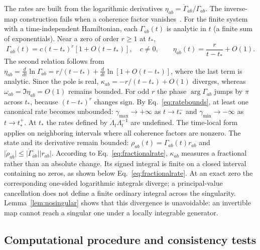 \documentclass[11pt,a4paper]{article}
\begin{document}
The rates are built from the logarithmic derivatives
$\eta_{ab}=\dot\Gamma_{ab}/\Gamma_{ab}$. The inverse-map construction
fails when a coherence factor vanishes~\cite{Hall2014}. For the finite
system with a time-independent Hamiltonian, each $\Gamma_{ab}(t)$ is
analytic in $t$ (a finite sum of exponentials). Near a zero of order
$r\ge1$ at $t_*$,
\begin{equation}
 \Gamma_{ab}(t)=c(t-t_*)^r[1+O(t-t_*)],\quad c\ne0,
 \qquad \eta_{ab}(t)=\frac{r}{t-t_*}+O(1).
 \label{eq:singularfactor}
\end{equation}
The second relation follows from
$\eta_{ab}=\frac{d}{dt}\ln\Gamma_{ab}=r/(t-t_*)+\frac{d}{dt}\ln[1+O(t-t_*)]$,
where the last term is analytic. Since the pole is real,
$\kappa_{ab}=-r/(t-t_*)+O(1)$ diverges, whereas
$\omega_{ab}=\Im\eta_{ab}=O(1)$ remains bounded. For odd $r$ the phase
$\arg\Gamma_{ab}$ jumps by $\pi$ across $t_*$, because $(t-t_*)^r$ changes
sign. By Eq.~\eqref{eq:ratebounds}, at least one canonical rate becomes
unbounded: $\gamma_{\max}\to+\infty$ as $t\to t_*^-$ and
$\gamma_{\min}\to-\infty$ as $t\to t_*^+$. At $t_*$ the rates defined by
$\dot\Lambda_t\Lambda_t^{-1}$ are undefined. The time-local form
applies on neighboring intervals where all coherence factors are nonzero.
The state and its derivative remain bounded:
$\rho_{ab}(t)=\Gamma_{ab}(t)r_{ab}$ and
$\lvert\dot\rho_{ab}\rvert\le\lvert\dot\Gamma_{ab}\rvert\lvert r_{ab}\rvert$.
According to Eq.~\eqref{eq:fractionalrate}, $\kappa_{ab}$ measures a
fractional rather than an absolute change. Its signed integral is finite
on a closed interval containing no zeros, as shown below
Eq.~\eqref{eq:fractionalrate}. At an exact zero the corresponding
one-sided logarithmic integrals diverge; a principal-value cancellation
does not define a finite ordinary integral across the singularity.
Lemma~\ref{lem:nosingular} shows that this divergence is unavoidable: an
invertible map cannot reach a singular one under a locally integrable
generator.

\subsection{Computational procedure and consistency tests}
\label{sec:procedure}
\end{document}
